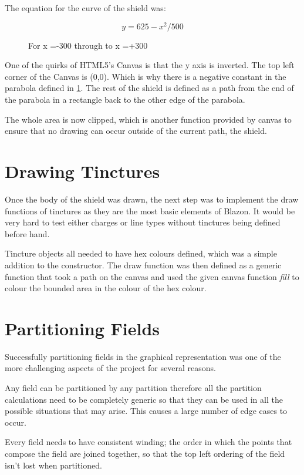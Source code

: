 The equation for the curve of the shield was:


\begin{figure}[H]
$$ y = 625- x^2/500  $$
\caption{For x =-300 through to x =+300}
\label{math:curve}
\end{figure}


One of the quirks of HTML5's Canvas is that the y axis is inverted.  The top left corner of the Canvas is (0,0).  Which is why there is a negative constant in the parabola defined in \ref{math:curve}.  The rest of the shield is defined as a path from the end of the parabola in a rectangle back to the other edge of the parabola.

The whole area is now clipped, which is another function provided by canvas to ensure that no drawing can occur outside of the current path, the shield. 


\section{Drawing Tinctures}
{
	
Once the body of the shield was drawn, the next step was to implement the draw functions of tinctures as they are the most basic elements of Blazon.  It would be very hard to test either charges or line types without tinctures being defined before hand.

Tincture objects all needed to have hex colours defined, which was a simple addition to the constructor.  The draw function was then defined as a generic function that took a path on the canvas and used the given canvas function \emph{fill} to colour the bounded area in the colour of the hex colour.  

}

\section{Partitioning Fields}

Successfully partitioning fields in the graphical representation was one of the more challenging aspects of the project for several reasons.


Any field can be partitioned by any partition therefore all the partition calculations need to be completely generic so that they can be used in all the possible situations that may arise.  This causes a large number of edge cases to occur. 

Every field needs to have consistent winding; the order in which the points that compose the field are joined together, so that the top left ordering of the field isn't lost when partitioned.


